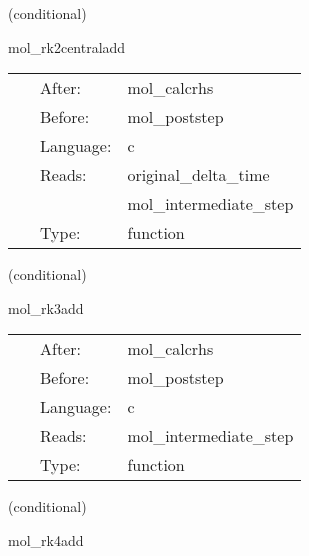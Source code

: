 \vspace{5mm}

   (conditional) 

\hspace{5mm} mol\_rk2centraladd 

\hspace{5mm}{\it updates calculated with the central runge-kutta 2 method } 


\hspace{5mm}

 \begin{tabular*}{160mm}{cll} 
~ & After:  & mol\_calcrhs \\ 
~ & Before:  & mol\_poststep \\ 
~ & Language:  & c \\ 
~ & Reads:  & original\_delta\_time \\ 
~& ~ &mol\_intermediate\_step\\ 
~ & Type:  & function \\ 
\end{tabular*} 


\vspace{5mm}

   (conditional) 

\hspace{5mm} mol\_rk3add 

\hspace{5mm}{\it updates calculated with the efficient runge-kutta 3 method } 


\hspace{5mm}

 \begin{tabular*}{160mm}{cll} 
~ & After:  & mol\_calcrhs \\ 
~ & Before:  & mol\_poststep \\ 
~ & Language:  & c \\ 
~ & Reads:  & mol\_intermediate\_step \\ 
~ & Type:  & function \\ 
\end{tabular*} 


\vspace{5mm}

   (conditional) 

\hspace{5mm} mol\_rk4add 

\hspace{5mm}{\it updates calculated with the efficient runge-kutta 4 method } 



